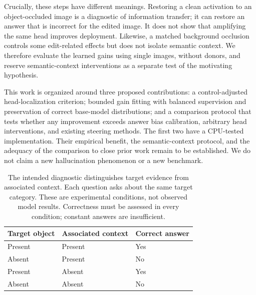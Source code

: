 Crucially, these steps have different meanings. Restoring a clean activation
to an object-occluded image is a diagnostic of information transfer; it can
restore an answer that is incorrect for the edited image. It does not show
that amplifying the same head improves deployment. Likewise, a matched
background occlusion controls some edit-related effects but does not isolate
semantic context. We therefore evaluate the learned gains using single
images, without donors, and reserve semantic-context interventions as a
separate test of the motivating hypothesis.

This work is organized around three proposed contributions: a
control-adjusted head-localization criterion; bounded gain fitting with
balanced supervision and preservation of correct base-model distributions;
and a comparison protocol that tests whether any improvement exceeds answer
bias calibration, arbitrary head interventions, and existing steering
methods. The first two have a CPU-tested implementation. Their empirical
benefit, the semantic-context protocol, and the adequacy of the comparison
to close prior work remain to be established. We do not claim a new
hallucination phenomenon or a new benchmark.

\begin{table}[t]
\centering
\small
\begin{tabular}{lll}
\toprule
Target object & Associated context & Correct answer \\
\midrule
Present & Present & Yes \\
Absent & Present & No \\
Present & Absent & Yes \\
Absent & Absent & No \\
\bottomrule
\end{tabular}
\caption{The intended diagnostic distinguishes target evidence from
associated context. Each question asks about the same target category.
These are experimental conditions, not observed model results. Correctness
must be assessed in every condition; constant answers are insufficient.}
\label{tab:conditions}
\end{table}
